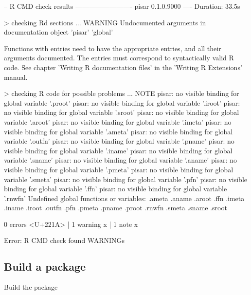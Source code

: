 \documentclass[a4paper,12pt]{article}\usepackage[]{graphicx}\usepackage[]{color}
\begin{document}
\begin{Schunk}
\begin{Soutput}
   

-- R CMD check results ------------------------- pisar 0.1.0.9000 ----
Duration: 33.5s

> checking Rd \usage sections ... WARNING
  Undocumented arguments in documentation object 'pisar'
    'global'
  
  Functions with \usage entries need to have the appropriate \alias
  entries, and all their arguments documented.
  The \usage entries must correspond to syntactically valid R code.
  See chapter 'Writing R documentation files' in the 'Writing R
  Extensions' manual.

> checking R code for possible problems ... NOTE
  pisar: no visible binding for global variable '.proot'
  pisar: no visible binding for global variable '.iroot'
  pisar: no visible binding for global variable '.sroot'
  pisar: no visible binding for global variable '.aroot'
  pisar: no visible binding for global variable '.imeta'
  pisar: no visible binding for global variable '.ameta'
  pisar: no visible binding for global variable '.outfn'
  pisar: no visible binding for global variable '.pname'
  pisar: no visible binding for global variable '.iname'
  pisar: no visible binding for global variable '.sname'
  pisar: no visible binding for global variable '.aname'
  pisar: no visible binding for global variable '.pmeta'
  pisar: no visible binding for global variable '.smeta'
  pisar: no visible binding for global variable '.pfn'
  pisar: no visible binding for global variable '.ffn'
  pisar: no visible binding for global variable '.rnwfn'
  Undefined global functions or variables:
    .ameta .aname .aroot .ffn .imeta .iname .iroot .outfn .pfn .pmeta
    .pname .proot .rnwfn .smeta .sname .sroot

0 errors <U+221A> | 1 warning x | 1 note x
\end{Soutput}
\begin{Soutput}
Error: R CMD check found WARNINGs
\end{Soutput}
\end{Schunk}
\clearpage
\subsection{Build a package}

Build the package
\end{document}
